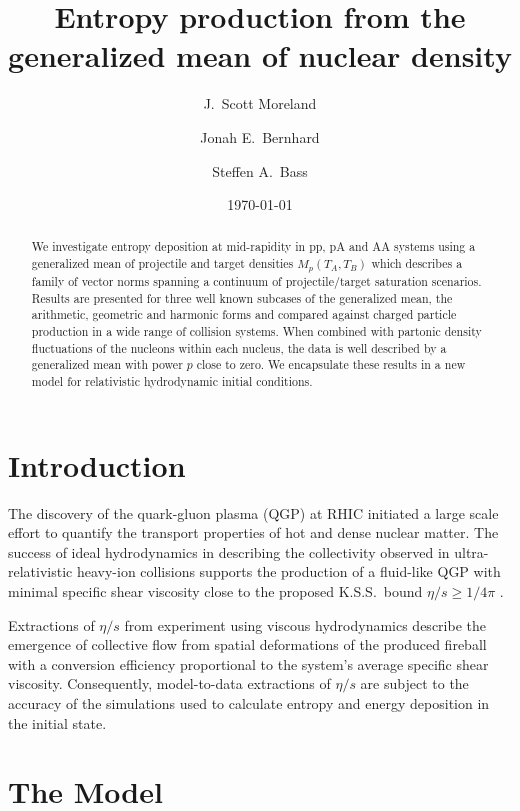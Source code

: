 \documentclass[aps,prl,reprint,amsmath,nofootinbib]{revtex4-1}
\begin{document}
\title{Entropy production from the generalized mean of nuclear density}

\author{J.\ Scott Moreland}
\author{Jonah E.\ Bernhard}
\author{Steffen A.\ Bass}

\date{\today}


\begin{abstract}
   We investigate entropy deposition at mid-rapidity in pp, pA and AA systems using a generalized mean of
   projectile and target densities $M_p(T_A,T_B)$ which describes a family of vector norms spanning a
   continuum of projectile/target saturation scenarios.  Results are presented for three well known subcases
   of the generalized mean, the arithmetic, geometric and harmonic forms and compared against charged particle
   production in a wide range of collision systems. When combined with partonic density fluctuations of the
   nucleons within each nucleus, the data is well described by a generalized mean with power $p$ close to
   zero. We encapsulate these results in a new model for relativistic hydrodynamic initial conditions.
\end{abstract}

\maketitle

\section{Introduction}

The discovery of the quark-gluon plasma (QGP) at RHIC initiated a large scale effort to quantify the transport
properties of hot and dense nuclear matter. The success of ideal hydrodynamics in describing the collectivity
observed in ultra-relativistic heavy-ion collisions supports the production of a fluid-like QGP with minimal
specific shear viscosity close to the proposed K.S.S.\ bound $\eta/s \ge 1/4\pi$ \cite{KSS, Bjorken}.

Extractions of $\eta/s$ from experiment using viscous hydrodynamics describe the emergence of collective flow
from spatial deformations of the produced fireball with a conversion efficiency proportional to the system's
average specific shear viscosity.  Consequently, model-to-data extractions of $\eta/s$ are subject to the
accuracy of the simulations used to calculate entropy and energy deposition in the initial state.

\section{The Model}
\end{document}
